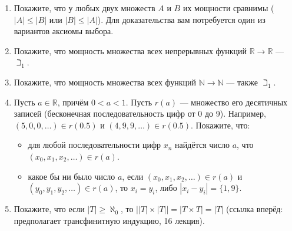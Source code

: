 \documentclass[10pt,a4paper,oneside]{article}
\begin{document}
\begin{enumerate}
\begin{enumerate}
\item Покажите, что главный фильтр для $x \in L$ является ультрафильтром.
\item Покажите, что множество дополнений конечных множеств до бесконечного образует фильтр (в качестве отношения порядка рассмотрим
отношение включения). Является ли этот фильтр ультрафильтром?
\item Покажите, что для ультрафильтра $F$ на булевой алгебре $L$ и $x \in L$ выполнено $x \in F$ или $\sim x \in F$. Также покажите,
что полное непротиворечивое множество формул образует ультрафильтр.
\item Покажите, что у любого фильтра есть содержащий его ультрафильтр (вам потребуется лемма Цорна для доказательства этого факта).
\end{enumerate}
\item Покажите, что у любых двух множеств $A$ и $B$ их мощности сравнимы ($|A| \le |B|$ или $|B| \le |A|$).
Для доказательства вам потребуется один из вариантов аксиомы выбора.
\item Покажите, что мощность множества всех непрерывных функций $\mathbb{R}\rightarrow\mathbb{R}$ --- $\beth_1$.
\item Покажите, что мощность множества всех функций $\mathbb{N}\rightarrow\mathbb{N}$ --- также $\beth_1$.

\item Пусть $a \in \mathbb{R}$, причём $0 < a < 1$. 
Пусть $r(a)$ --- множество его десятичных записей (бесконечная последовательность цифр от 0 до 9).
Например, $(5,0,0,\dots) \in r(0.5)$ и $(4,9,9,\dots) \in r(0.5)$.
Покажите, что:
\begin{itemize}
\item для любой последовательности цифр $x_n$ найдётся число $a$, что $(x_0, x_1, x_2, \dots) \in r(a)$.
\item какое бы ни было число $a$, если $(x_0, x_1, x_2,\dots) \in r(a)$ и
$(y_0, y_1, y_2,\dots) \in r(a)$, то $x_i = y_i$, либо $|x_i - y_i| = \{1,9\}$.
\end{itemize}

\item Покажите, что если $|T| \ge \aleph_0$, то $\big||T|\times|T|\big| = |T\times T| = |T|$ (ссылка вперёд:
предполагает трансфинитную индукцию, 16 лекция).
\end{enumerate}
\end{document}
